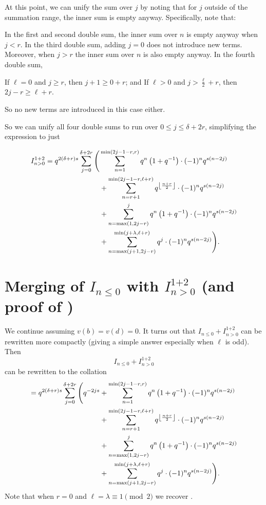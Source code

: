 At this point, we can unify the sum over $j$ by noting that for $j$ outside of the
summation range, the inner sum is empty anyway.
Specifically, note that:
\begin{itemize}
  \ii In the first and second double sum,
  the inner sum over $n$ is empty anyway when $j < r$.
  \ii In the third double sum, adding $j=0$ does not introduce new terms.
  Moreover, when $j > r$ the inner sum over $n$ is also empty anyway.
  \ii In the fourth double sum,
  \begin{itemize}
    \ii If $\ell = 0$ and $j \ge r$, then $j+1 \ge 0+r$; and
    \ii If $\ell > 0$ and $j > \frac{\ell}{2} + r$, then $2j-r \ge \ell+r$.
  \end{itemize}
  So no new terms are introduced in this case either.
\end{itemize}
So we can unify all four double sums to run over $0 \le j \le \delta + 2r$,
simplifying the expression to just

\begin{align*}
  I_{n > 0}^{\text{1+2}}
  = q^{2(\delta+r)s}
  \sum_{j = 0}^{\delta + 2r} \Bigg(
    & \sum_{n=1}^{\min(2j-1-r, r)}
      q^{n} \left( 1 + q^{-1} \right) \cdot (-1)^n q^{s(n-2j)} \\
    & + \sum_{n=r+1}^{\min(2j-1-r, \ell+r)}
      q^{\left\lfloor \frac{n+r}{2} \right\rfloor} \cdot (-1)^n q^{s(n-2j)} \\
    &+ \sum_{n=\max(1,2j-r)}^{j}
      q^{n} \left( 1 + q^{-1} \right) \cdot (-1)^n q^{s(n-2j)} \\
    &+ \sum_{n=\max(j+1, 2j-r)}^{\min(j+\lambda, \ell+r)} q^{j} \cdot (-1)^n q^{s(n-2j)} \Bigg).
\end{align*}

\section{Merging of $I_{n \le 0}$ with $I_{n > 0}^{\text{1+2}}$ (and proof of )}
We continue assuming $v(b) = v(d) = 0$.
It turns out that $I_{n \le 0} + I_{n > 0}^{\text{1+2}}$ can be rewritten more compactly
(giving a simple answer especially when $\ell$ is odd).
Then
\[
  I_{n \le 0} + I_{n > 0}^{\text{1+2}}
\]
can be rewritten to the collation
\begin{align*}
  = q^{2(\delta+r)s}
  \sum_{j = 0}^{\delta + 2r} \Bigg(
    q^{-2js}
    &+ \sum_{n=1}^{\min(2j-1-r, r)}
      q^{n} \left( 1 + q^{-1} \right) \cdot (-1)^n q^{s(n-2j)} \\
    &+ \sum_{n=r+1}^{\min(2j-1-r, \ell+r)}
      q^{\left\lfloor \frac{n+r}{2} \right\rfloor} \cdot (-1)^n q^{s(n-2j)} \\
    &+ \sum_{n=\max(1,2j-r)}^{j}
      q^{n} \left( 1 + q^{-1} \right) \cdot (-1)^n q^{s(n-2j)} \\
    &+ \sum_{n=\max(j+1, 2j-r)}^{\min(j+\lambda, \ell+r)} q^{j} \cdot (-1)^n q^{s(n-2j)} \Bigg).
\end{align*}
Note that when $r=0$ and $\ell = \lambda \equiv 1 \pmod 2$
we recover \cite[Equation (4.13)]{ref:AFL}.

